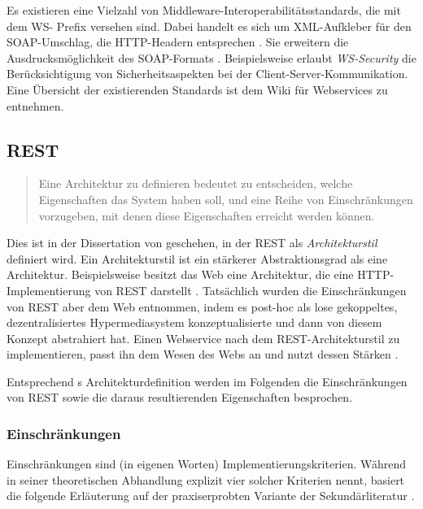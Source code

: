 \documentclass[11pt, a4paper, titlepage, listof=totoc, bibliography=totoc, index=totoc, twoside, openright, headings=normal]{scrreprt}
\begin{document}
Es existieren eine Vielzahl von Middleware-Interoperabilitätsstandards, die mit dem \glqq WS-\grqq{} Prefix versehen sind. Dabei handelt es sich um \glqq XML-Aufkleber\grqq{} für den SOAP-Umschlag, die HTTP-Headern entsprechen \citep{richardson07}. Sie erweitern die Ausdrucksmöglichkeit des SOAP-Formats \citep{wilde11}. Beispielsweise erlaubt \emph{WS-Security} die Berücksichtigung von Sicherheitsaspekten bei der Client-Server-Kommunikation. Eine Übersicht der existierenden Standards ist dem Wiki für Webservices \citep{webServiceWiki09} zu entnehmen.

\subsection{REST}
\label{REST}
\begin{quote}
\glqq Eine Architektur zu definieren bedeutet zu entscheiden, welche Eigenschaften das System haben soll, und eine Reihe von Einschränkungen vorzugeben, mit denen diese Eigenschaften erreicht werden können.\grqq{} \citep{tilkov11}
\end{quote}

Dies ist in der Dissertation von \citeauthor{fielding00} geschehen, in der REST als \emph{Architekturstil} definiert wird. Ein Architekturstil ist ein stärkerer Abstraktionsgrad als eine Architektur. Beispielsweise besitzt das Web eine Architektur, die eine HTTP-Implementierung von REST darstellt \citep{tilkov11}. Tatsächlich wurden die Einschränkungen von REST aber dem Web entnommen, indem \citeauthor{fielding00} es post-hoc als lose gekoppeltes, dezentralisiertes Hypermediasystem konzeptualisierte \citep{wilde11} und dann von diesem Konzept abstrahiert hat. Einen Webservice nach dem REST-Architekturstil zu implementieren, passt ihn dem Wesen des Webs an und nutzt dessen Stärken \citep{tilkov11}.

Entsprechend \citeauthor{tilkov11}s Architekturdefinition werden im Folgenden die Einschränkungen von REST sowie die daraus resultierenden Eigenschaften besprochen.

\subsubsection{Einschränkungen}
\label{Einschränkungen}
Einschränkungen sind (in eigenen Worten) Implementierungskriterien. Während \citeauthor{fielding00} in seiner theoretischen Abhandlung explizit vier solcher Kriterien nennt, basiert die folgende Erläuterung auf der praxiserprobten Variante der Sekundärliteratur \citep{wilde11, tilkov11}.
\end{document}
